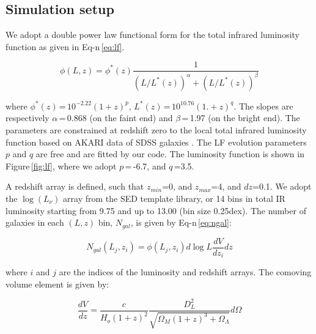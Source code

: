 \documentclass{emulateapj}
\begin{document}
\subsection{Simulation setup}

We adopt a double power law functional form for the total infrared luminosity function as given in Eq-n\,\ref{eq:lf}.

\begin{equation}
\label{eq:lf}
\phi(L,z)=\phi^*(z)\frac{1}{(L/L^*(z))^\alpha+(L/L^*(z))^\beta}
\end{equation}

where $\phi^*(z)$\,=\,$10^{-2.22}(1+z)^p$, $L^*(z)$\,=\,$10^{10.76}(1.+z)^q$. The slopes are respectively $\alpha$\,=\,0.868 (on the faint end) and $\beta$\,=\,1.97 (on the bright end). The parameters are constrained at redshift zero to the local total infrared luminosity function based on AKARI data of SDSS galaxies \citep{goto11}. The LF evolution parameters $p$ and $q$ are free and are fitted by our code. The luminosity function is shown in Figure\,\ref{fig:lf}, where we adopt $p$\,=\,-6.7, and $q$\,=3.5.

\begin{figure*}[h]
\caption{Total IR luminosity function for galaxies (solid curves) and quasars (dashed curves). In both cases we use the double power law parameterization, see Goto et al. 2011, Negrello 2012, Hopkins et al. 2007 (for the quasar LF).  \label{fig:lf}}
\end{figure*}

A redshift array is defined, such that $z_{min}$=0, and $z_{max}$=4, and $dz$=0.1. We adopt the $\log(L_{\nu})$ array from the SED template library, or 14 bins in total IR luminosity starting from 9.75 and up to 13.00 (bin size 0.25dex). The number of galaxies in each $(L,z)$ bin, $N_{gal}$, is given by Eq-n\,\ref{eq:ngal}:

\begin{equation}
\label{eq:ngal}
N_{gal}(L_j,z_i)=\phi(L_j,z_i)d\log L\frac{dV}{dz_i}dz
\end{equation}

where $i$ and $j$ are the indices of the luminosity and redshift arrays. The comoving volume element is given by:

\begin{equation}
\frac{dV}{dz}=\frac{c}{H_o(1+z)^2}\frac{D_L^2}{\sqrt{\Omega_M(1+z)^3+\Omega_{\Lambda}}}d\Omega
\end{equation}
\end{document}
